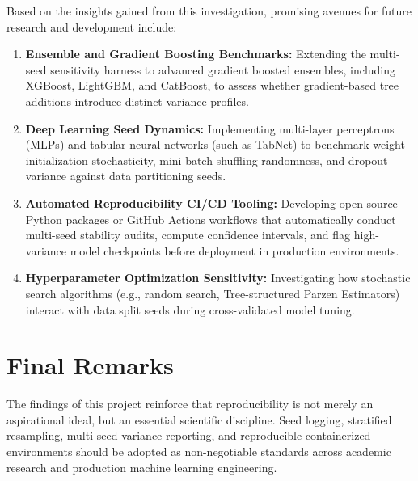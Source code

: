 Based on the insights gained from this investigation, promising avenues for future research and development include:
\begin{enumerate}
    \item \textbf{Ensemble and Gradient Boosting Benchmarks:} Extending the multi-seed sensitivity harness to advanced gradient boosted ensembles, including XGBoost, LightGBM, and CatBoost, to assess whether gradient-based tree additions introduce distinct variance profiles.
    \item \textbf{Deep Learning Seed Dynamics:} Implementing multi-layer perceptrons (MLPs) and tabular neural networks (such as TabNet) to benchmark weight initialization stochasticity, mini-batch shuffling randomness, and dropout variance against data partitioning seeds.
    \item \textbf{Automated Reproducibility CI/CD Tooling:} Developing open-source Python packages or GitHub Actions workflows that automatically conduct multi-seed stability audits, compute confidence intervals, and flag high-variance model checkpoints before deployment in production environments.
    \item \textbf{Hyperparameter Optimization Sensitivity:} Investigating how stochastic search algorithms (e.g., random search, Tree-structured Parzen Estimators) interact with data split seeds during cross-validated model tuning.
\end{enumerate}

\section{Final Remarks}
\label{sec:final_remarks}

The findings of this project reinforce that reproducibility is not merely an aspirational ideal, but an essential scientific discipline. Seed logging, stratified resampling, multi-seed variance reporting, and reproducible containerized environments should be adopted as non-negotiable standards across academic research and production machine learning engineering.

